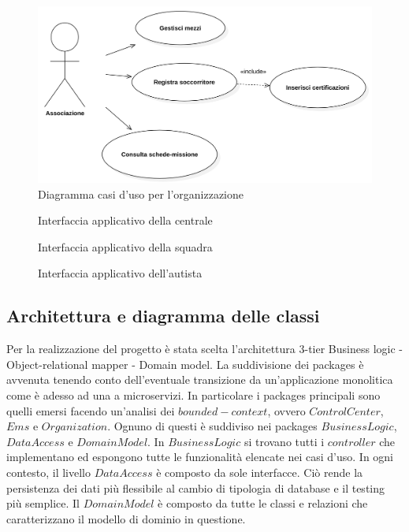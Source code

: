 \documentclass{article}
\begin{document}
    \begin{figure}
        \centering
        \includegraphics[width=4.5in]{diagrams/png/uc-associazione.png}
        \caption{Diagramma casi d'uso per l'organizzazione}
        \label{fig:uc-organization}
    \end{figure}

    \begin{figure}
        \centering
        
        \caption{Interfaccia applicativo della centrale}
        \label{fig:mockup-controlcenter}
    \end{figure}
    \begin{figure}
        \centering
        
        \caption{Interfaccia applicativo della squadra}
        \label{fig:mockup-soccorritore}
    \end{figure}
    \begin{figure}
        \centering
        
        \caption{Interfaccia applicativo dell'autista}
        \label{fig:mockup-autista}
    \end{figure}

    \subsection{Architettura e diagramma delle classi}
    Per la realizzazione del progetto è stata scelta l'architettura 3-tier Business logic - Object-relational mapper - Domain model.
    La suddivisione dei packages è avvenuta tenendo conto dell'eventuale transizione da un'applicazione monolitica come è adesso ad una a microservizi.
    In particolare i packages principali sono quelli emersi facendo un'analisi dei $bounded-context$, ovvero $ControlCenter$, $Ems$ e $Organization$.
    Ognuno di questi è suddiviso nei packages $BusinessLogic$, $DataAccess$ e $DomainModel$.
    \newline In $BusinessLogic$ si trovano tutti i $controller$ che implementano ed espongono tutte le funzionalità elencate nei casi d'uso.
    \newline In ogni contesto, il livello $DataAccess$ è composto da sole interfacce. Ciò rende la persistenza dei dati più flessibile al cambio di tipologia di database e il testing più semplice.
    \newline Il $DomainModel$ è composto da tutte le classi e relazioni che caratterizzano il modello di dominio in questione.
\end{document}
